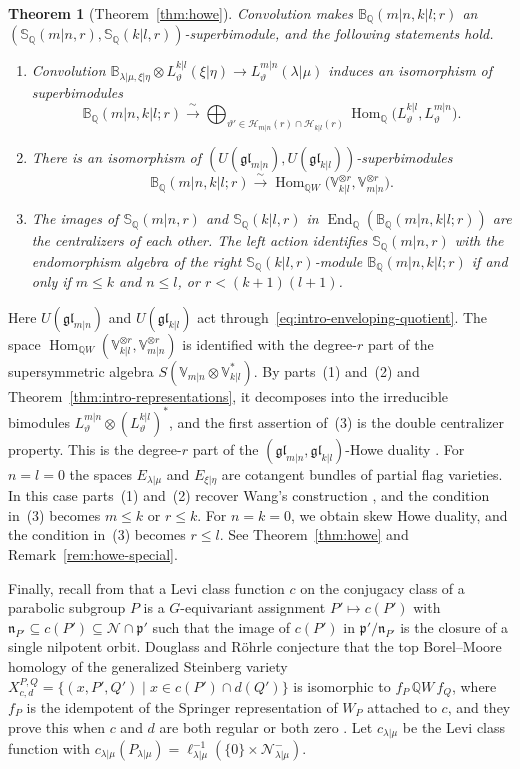 \documentclass[11pt,a4paper]{amsart}
\newtheorem{introthm}{Theorem}
\theoremstyle{definition}
\theoremstyle{remark}
\newcommand{\Q}{\mathbb Q}
\newcommand{\N}{\mathcal N}
\newcommand{\bS}{\mathbb S}
\newcommand{\bB}{\mathbb B}
\newcommand{\End}{\operatorname{End}}
\newcommand{\Hom}{\operatorname{Hom}}
\newcommand{\lm}{\lambda|\mu}
\newcommand{\xh}{\xi|\eta}
\numberwithin{equation}{section}
\begin{document}
\begin{introthm}[Theorem~\ref{thm:howe}]\label{thm:intro-howe}
Convolution makes $\bB_\Q(m|n,k|l;r)$ an $(\bS_\Q(m|n,r),\bS_\Q(k|l,r))$-superbimodule,
and the following statements hold.
\begin{enumerate}
\item Convolution
$\bB_{\lm,\xh}\otimes L^{k|l}_\vartheta(\xh)\to L^{m|n}_\vartheta(\lm)$
induces an isomorphism of superbimodules
$$
\bB_\Q(m|n,k|l;r)\xrightarrow{\ \sim\ }
\bigoplus_{\vartheta'\in\mathcal H_{m|n}(r)\cap\mathcal H_{k|l}(r)}
\Hom_\Q\bigl(L^{k|l}_\vartheta,L^{m|n}_\vartheta\bigr).
$$
\item There is an isomorphism of
$(U(\mathfrak{gl}_{m|n}),U(\mathfrak{gl}_{k|l}))$-superbimodules
$$
\bB_\Q(m|n,k|l;r)\xrightarrow{\ \sim\ }
\Hom_{\Q W}\bigl(\mathbb V_{k|l}^{\otimes r},\mathbb V_{m|n}^{\otimes r}\bigr).
$$
\item The images of $\bS_\Q(m|n,r)$ and $\bS_\Q(k|l,r)$ in $\End_\Q(\bB_\Q(m|n,k|l;r))$ are
the centralizers of each other. The left action identifies $\bS_\Q(m|n,r)$
with the endomorphism algebra of the right $\bS_\Q(k|l,r)$-module $\bB_\Q(m|n,k|l;r)$
if and only if $m\leq k$ and $n\leq l$, or $r<(k+1)(l+1)$.
\end{enumerate}
\end{introthm}
Here $U(\mathfrak{gl}_{m|n})$ and $U(\mathfrak{gl}_{k|l})$ act
through~\eqref{eq:intro-enveloping-quotient}. The space
$\Hom_{\Q W}(\mathbb V_{k|l}^{\otimes r},\mathbb V_{m|n}^{\otimes r})$ is
identified with the degree-$r$ part of the supersymmetric algebra
$S(\mathbb V_{m|n}\otimes\mathbb V_{k|l}^*)$. By parts~(1) and~(2) and
Theorem~\ref{thm:intro-representations}, it decomposes into the
irreducible bimodules $L^{m|n}_\vartheta\otimes(L^{k|l}_\vartheta)^*$, and
the first assertion of~(3) is the double centralizer property. This is
the degree-$r$ part of the $(\mathfrak{gl}_{m|n},\mathfrak{gl}_{k|l})$-Howe
duality \cite{How89,CW01}. For $n=l=0$ the spaces $E_{\lm}$ and $E_{\xh}$
are cotangent bundles of partial flag varieties. In this case parts~(1) and~(2) recover Wang's construction \cite{Wan01},
and the condition in~(3) becomes $m\leq k$ or $r\leq k$. For $n=k=0$, we obtain skew Howe duality, and the
condition in~(3) becomes $r\leq l$. See Theorem~\ref{thm:howe} and
Remark~\ref{rem:howe-special}.

Finally, recall from \cite[Section~2.4]{DRsurvey} that a Levi class
function $c$ on the conjugacy class of a parabolic subgroup $P$ is a
$G$-equivariant assignment $P'\mapsto c(P')$ with
$\mathfrak n_{P'}\subseteq c(P')\subseteq\N\cap\mathfrak p'$ such that the
image of $c(P')$ in $\mathfrak p'/\mathfrak n_{P'}$ is the closure of a
single nilpotent orbit. Douglass and R\"ohrle
conjecture \cite[Conjecture~3.19]{DRsurvey} that the top Borel--Moore
homology of the generalized Steinberg variety
$X^{P,Q}_{c,d}=\{(x,P',Q')\mid x\in c(P')\cap d(Q')\}$ is isomorphic to
$f_P\,\Q W\,f_Q$, where $f_P$ is the idempotent of the Springer
representation of $W_P$ attached to $c$, and they prove this when $c$
and $d$ are both regular or both zero \cite{DR}. Let $c_{\lm}$ be the Levi
class function with
$c_{\lm}(P_{\lm})=\ell_{\lm}^{-1}(\{0\}\times\N_{\lm}^-)$.
\end{document}
